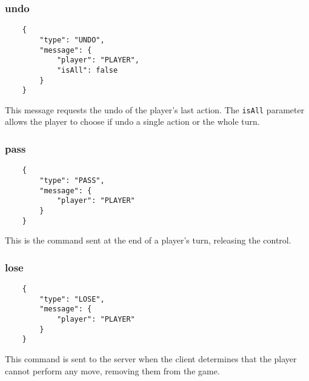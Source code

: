 \documentclass[a4paper,12pt,english]{article}
\begin{document}
	\subsubsection{undo}
	\begin{verbatim}
	{
	    "type": "UNDO",
	    "message": {
	        "player": "PLAYER",
	        "isAll": false
	    }
	}
	\end{verbatim}
	This message requests the undo of the player's last action. The \texttt{isAll} parameter allows the player to choose if undo a single action or the whole turn.
	
	\subsubsection{pass}
	\begin{verbatim}
	{
	    "type": "PASS",
	    "message": {
	        "player": "PLAYER"
	    }
	}
	\end{verbatim}
	This is the command sent at the end of a player's turn, releasing the control.
	
	\subsubsection{lose}
	\begin{verbatim}
	{
	    "type": "LOSE",
	    "message": {
	        "player": "PLAYER"
	    }
	}
	\end{verbatim}
	This command is sent to the server when the client determines that the player cannot perform any move, removing them from the game.
\end{document}
